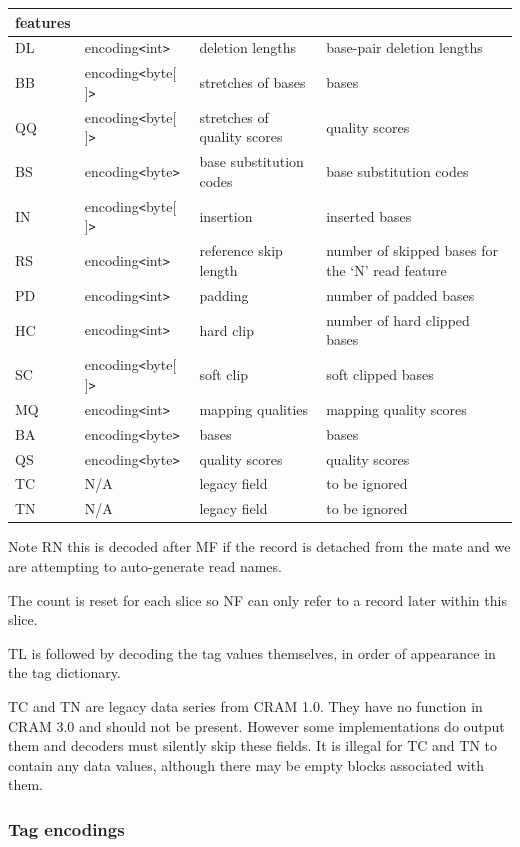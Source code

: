 \documentclass[a4paper]{article}
\begin{document}
\begin{threeparttable}[t]
\begin{tabular}{|l|l|>{\raggedright}p{100pt}|>{\raggedright}p{220pt}|}
features\tabularnewline
\hline
DL & encoding\texttt{<}int\texttt{>} & deletion lengths & base-pair deletion lengths\tabularnewline
\hline
BB & encoding\texttt{<}byte[ ]\texttt{>} & stretches of bases & bases\tabularnewline
\hline
QQ & encoding\texttt{<}byte[ ]\texttt{>} & stretches of quality scores & quality scores\tabularnewline
\hline
BS & encoding\texttt{<}byte\texttt{>} & base substitution codes & base substitution
codes\tabularnewline
\hline
IN & encoding\texttt{<}byte[ ]\texttt{>} & insertion & inserted bases\tabularnewline
\hline
RS & encoding\texttt{<}int\texttt{>} & reference skip length & number of skipped 
bases for the `N' read feature\tabularnewline
\hline
PD & encoding\texttt{<}int\texttt{>} & padding & number of padded bases\tabularnewline
\hline
HC & encoding\texttt{<}int\texttt{>} & hard clip & number of hard clipped bases\tabularnewline
\hline
SC & encoding\texttt{<}byte[ ]\texttt{>} & soft clip & soft clipped bases\tabularnewline
\hline
MQ & encoding\texttt{<}int\texttt{>} & mapping qualities & mapping quality scores\tabularnewline
\hline
BA & encoding\texttt{<}byte\texttt{>} & bases & bases\tabularnewline
\hline
QS & encoding\texttt{<}byte\texttt{>} & quality scores & quality scores\tabularnewline
\hline
TC\tnote{d} & N/A & legacy field & to be ignored\tabularnewline
\hline
TN\tnote{d} & N/A & legacy field & to be ignored\tabularnewline
\end{tabular}

\begin{tablenotes}
\item[a] Note RN this is decoded after MF if the record is detached from the mate and we are attempting to auto-generate read names.
\item[b] The count is reset for each slice so NF can only refer to a record later within this slice.
\item[c] TL is followed by decoding the tag values themselves, in order of appearance in the tag dictionary.
\item[d] TC and TN are legacy data series from CRAM 1.0.
They have no function in CRAM 3.0 and should not be present.
However some implementations do output them and decoders must silently skip these fields.
It is illegal for TC and TN to contain any data values, although there
may be empty blocks associated with them.
\end{tablenotes}
\end{threeparttable}

\subsubsection*{Tag encodings}
\label{subsubsec:tags}
\end{document}
